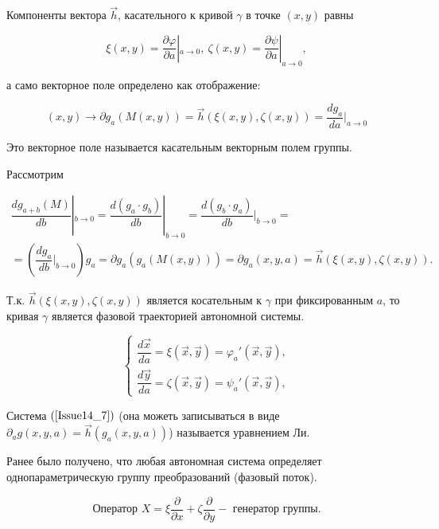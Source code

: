 Компоненты вектора $\vec{h}$, касательного к кривой $\gamma$ в точке $(x,y)$ равны

\[ \xi(x,y) = \dfrac{\partial \varphi}{\partial a}|_{a \rightarrow 0},\ \zeta(x,y) = \dfrac{\partial \psi }{\partial a}|_{a \rightarrow 0}, \]

а само векторное поле определено как отображение:

\begin{equation}
	(x,y) \rightarrow \partial g_a(M(x,y)) = \vec{h}(\xi(x,y), \zeta(x,y)) = \dfrac{dg_a}{da}|_{a \rightarrow 0}
	\label{Issue14_6}
\end{equation}

Это векторное поле называется $\textbf{касательным векторным полем}$ группы.

Рассмотрим 

\begin{equation}
	\begin{gathered}
		\dfrac{dg_{a+b}(M)}{db}|_{b\rightarrow 0} = \dfrac{d(g_a\cdot g_b)}{db}|_{b\rightarrow0} = \dfrac{d(g_b\cdot g_a)}{db}|_{b\rightarrow 0} = \\
		= (\dfrac{dg_a}{db}|_{b\rightarrow 0})g_a = \partial g_a (g_a(M(x,y))) = \partial g_a (x,y,a) = \vec{h}(\xi(x,y), \zeta(x,y)).
	\end{gathered}
\end{equation}

Т.к. $\vec{h}(\xi(x,y), \zeta(x,y))$ является косательным к $\gamma$ при фиксированным $a$, то кривая $\gamma$ является $\textbf{фазовой траекторией}$ автономной системы.

\begin{equation}
	\begin{cases}
		\dfrac{d\vec{x}}{da} = \xi(\vec{x}, \vec{y}) = \varphi_a'(\vec{x}, \vec{y}), \\
		\dfrac{d\vec{y}}{da} = \zeta(\vec{x}, \vec{y}) = \psi_a'(\vec{x}, \vec{y}),		
	\end{cases}
	\label{Issue14_7}
\end{equation}

Система $(\ref{Issue14_7})$ (она можеть записываться в виде $\partial_a g(x,y,a) = \vec{h}(g_a(x,y,a))$) называется $\textbf{уравнением Ли}$.

Ранее было получено, что любая автономная система определяет однопараметрическую группу преобразований (фазовый поток).


\begin{equation}
\text{Оператор } X = \xi \dfrac{\partial}{\partial x} + \zeta \dfrac{\partial}{\partial y} - \text{ генератор группы.}
\label{Issue14_8}
\end{equation}

